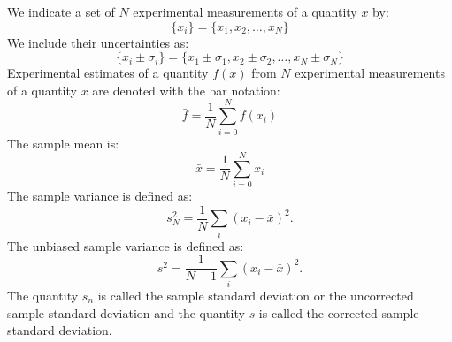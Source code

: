 \documentclass[12pt,oneside]{book}
\begin{document}
We indicate a set of $N$ experimental measurements of a quantity $x$ by:
\begin{displaymath}
\{x_i\} =   \{x_1, x_2, \dots , x_N \}
\end{displaymath}
We include their uncertainties as:
\begin{displaymath}
\{x_i \pm \sigma_i\} =   \{x_1 \pm \sigma_1, x_2 \pm \sigma_2, \dots , x_N \pm \sigma_N \}
\end{displaymath}
Experimental estimates of a quantity $f(x)$ from $N$ experimental measurements of a quantity $x$ are denoted with the bar notation:
\begin{displaymath}
  \bar{f} = \frac{1}{N} \sum_{i=0}^N f(x_i)
\end{displaymath}
The sample mean is:
\begin{displaymath}
  \bar{x} = \frac{1}{N} \sum_{i=0}^N x_i
\end{displaymath}
The sample variance is defined as:
\begin{displaymath}
s_N^2  = \frac{1}{N} \sum_i (x_i-\bar{x})^2.
\end{displaymath}
The unbiased sample variance is defined as:
\begin{displaymath}
s^2  = \frac{1}{N-1} \sum_i (x_i-\bar{x})^2.
\end{displaymath}
The quantity $s_n$ is called the sample standard deviation or the
uncorrected sample standard deviation and the quantity $s$ is called
the corrected sample standard deviation.  
\end{document}
